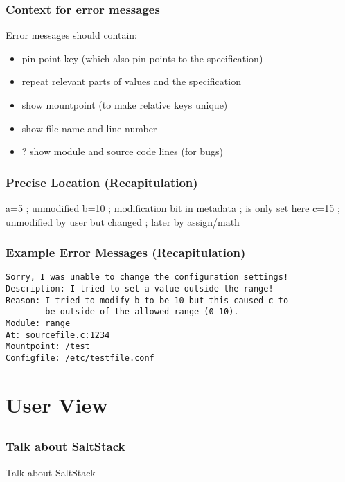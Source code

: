 \begin{frame}
	\frametitle{Context for error messages}

	Error messages should contain:

	\begin{itemize}[<+-| alert@+>]
	\item pin-point key (which also pin-points to the specification)
	\item repeat relevant parts of values and the specification
	\item show mountpoint (to make relative keys unique)
	\item show file name and line number
	\item ? show module and source code lines (for bugs)
	\end{itemize}
\end{frame}

\begin{frame}[fragile]
	\frametitle{Precise Location (Recapitulation)}

	\begin{code}[language=CfgElektra,gobble=4]
	a=5  ; unmodified
	b=10 ; modification bit in metadata
	     ; is only set here
	c=15 ; unmodified by user but changed
	     ; later by assign/math
	\end{code}
\end{frame}

\begin{frame}[fragile]
	\frametitle{Example Error Messages (Recapitulation)}
\begin{verbatim}
Sorry, I was unable to change the configuration settings!
Description: I tried to set a value outside the range!
Reason: I tried to modify b to be 10 but this caused c to
        be outside of the allowed range (0-10).
Module: range
At: sourcefile.c:1234
Mountpoint: /test
Configfile: /etc/testfile.conf
\end{verbatim}
\end{frame}




\section{User View}

\subsection{}

\begin{frame}
	\frametitle{Talk about SaltStack}

	\begin{alertblock}{Talk about SaltStack}
	\end{alertblock}
\end{frame}

